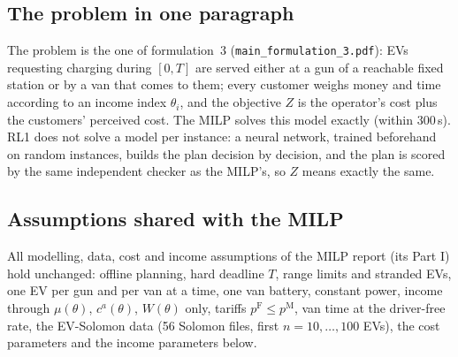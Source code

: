 \documentclass[11pt,a4paper]{article}
\begin{document}
\subsection{The problem in one paragraph}
The problem is the one of formulation~3 (\texttt{main\_formulation\_3.pdf}): EVs requesting charging during $[0,T]$ are served either at a gun of a reachable fixed station or by a van that comes to them; every customer weighs money and time according to an income index $\theta_i$, and the objective $Z$ is the operator's cost plus the customers' perceived cost. The MILP solves this model exactly (within 300\,s). RL1 does not solve a model per instance: a neural network, trained beforehand on random instances, builds the plan decision by decision, and the plan is scored by the same independent checker as the MILP's, so $Z$ means exactly the same.

\subsection{Assumptions shared with the MILP}
All modelling, data, cost and income assumptions of the MILP report (its Part I) hold unchanged: offline planning, hard deadline $T$, range limits and stranded EVs, one EV per gun and per van at a time, one van battery, constant power, income through $\mu(\theta)$, $c^{a}(\theta)$, $W(\theta)$ only, tariffs $p^{\mathrm F}\le p^{\mathrm M}$, van time at the driver-free rate, the EV-Solomon data (56 Solomon files, first $n=10,\dots,100$ EVs), the cost parameters and the income parameters below.
\begin{table}[H]
\centering\small
\caption{Income parameters (identical for RL1 and the MILP).}
\label{tab:params}

\end{table}
\end{document}
